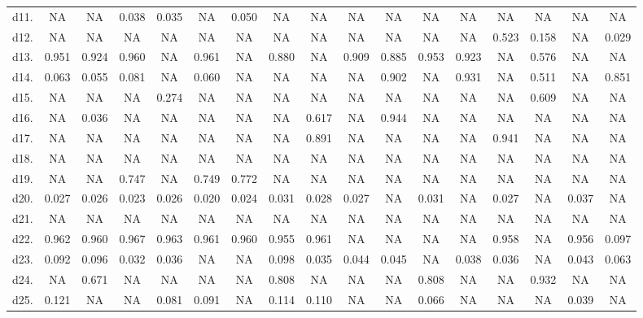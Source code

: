 \begin{table}
\begin{tabular}{lcccccccccccccccc}
d11. & NA    & NA    & 0.038 & 0.035 & NA    & 0.050 & NA    & NA    & NA    & NA    & NA    & NA    & NA    & NA    & NA    & NA \\
d12. & NA    & NA    & NA    & NA    & NA    & NA    & NA    & NA    & NA    & NA    & NA    & NA    & 0.523 & 0.158 & NA    & 0.029 \\
d13. & 0.951 & 0.924 & 0.960 & NA    & 0.961 & NA    & 0.880 & NA    & 0.909 & 0.885 & 0.953 & 0.923 & NA    & 0.576 & NA    & NA \\
d14. & 0.063 & 0.055 & 0.081 & NA    & 0.060 & NA    & NA    & NA    & NA    & 0.902 & NA    & 0.931 & NA    & 0.511 & NA    & 0.851 \\
d15. & NA    & NA    & NA    & 0.274 & NA    & NA    & NA    & NA    & NA    & NA    & NA    & NA    & NA    & 0.609 & NA    & NA \\
d16. & NA    & 0.036 & NA    & NA    & NA    & NA    & NA    & 0.617 & NA    & 0.944 & NA    & NA    & NA    & NA    & NA    & NA \\
d17. & NA    & NA    & NA    & NA    & NA    & NA    & NA    & 0.891 & NA    & NA    & NA    & NA    & 0.941 & NA    & NA    & NA \\
d18. & NA    & NA    & NA    & NA    & NA    & NA    & NA    & NA    & NA    & NA    & NA    & NA    & NA    & NA    & NA    & NA \\
d19. & NA    & NA    & 0.747 & NA    & 0.749 & 0.772 & NA    & NA    & NA    & NA    & NA    & NA    & NA    & NA    & NA    & NA \\
d20. & 0.027 & 0.026 & 0.023 & 0.026 & 0.020 & 0.024 & 0.031 & 0.028 & 0.027 & NA    & 0.031 & NA    & 0.027 & NA    & 0.037 & NA \\
d21. & NA    & NA    & NA    & NA    & NA    & NA    & NA    & NA    & NA    & NA    & NA    & NA    & NA    & NA    & NA    & NA \\
d22. & 0.962 & 0.960 & 0.967 & 0.963 & 0.961 & 0.960 & 0.955 & 0.961 & NA    & NA    & NA    & NA    & 0.958 & NA    & 0.956 & 0.097 \\
d23. & 0.092 & 0.096 & 0.032 & 0.036 & NA    & NA    & 0.098 & 0.035 & 0.044 & 0.045 & NA    & 0.038 & 0.036 & NA    & 0.043 & 0.063 \\
d24. & NA    & 0.671 & NA    & NA    & NA    & NA    & 0.808 & NA    & NA    & NA    & 0.808 & NA    & NA    & 0.932 & NA    & NA \\
d25. & 0.121 & NA    & NA    & 0.081 & 0.091 & NA    & 0.114 & 0.110 & NA    & NA    & 0.066 & NA    & NA    & NA    & 0.039 & NA \\

\end{tabular}
\end{table}
